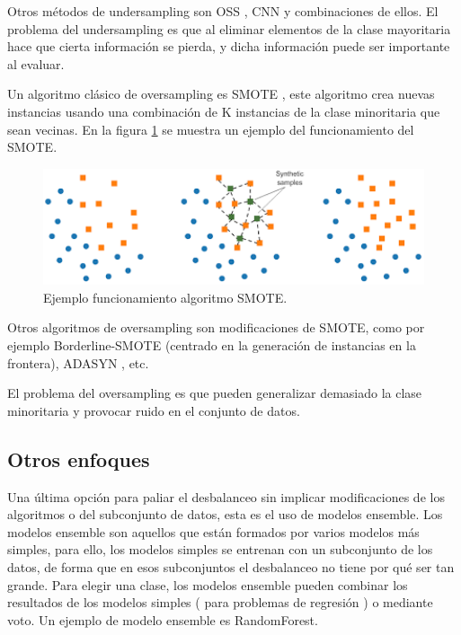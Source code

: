 Otros métodos de undersampling son OSS \cite{kubat1997addressing}, CNN \cite{hart1968condensed} y combinaciones de ellos. El problema del undersampling es que al eliminar elementos de la clase mayoritaria hace que cierta información se pierda, y dicha información puede ser importante al evaluar.\newline

Un algoritmo clásico de oversampling es SMOTE \cite{chawla2002smote}, este algoritmo crea nuevas instancias usando una combinación de K instancias de la clase minoritaria que sean vecinas. En la figura \ref{fig:29} se muestra un ejemplo del funcionamiento del SMOTE.\newline

\begin{figure}[H]
	\centering
	\includegraphics[width=120mm]{imagenes/smote-example.png}
	\caption{Ejemplo funcionamiento algoritmo SMOTE.}
	\label{fig:29}
\end{figure}
\verticalspace

Otros algoritmos de oversampling son modificaciones de SMOTE, como por ejemplo Borderline-SMOTE \cite{han2005borderline} (centrado en la generación de instancias en la frontera), ADASYN \cite{he2008adasyn}, etc.\newline

El problema del oversampling es que pueden generalizar demasiado la clase minoritaria y provocar ruido en el conjunto de datos.

\subsection{Otros enfoques}
Una última opción para paliar el desbalanceo sin implicar modificaciones de los algoritmos o del subconjunto de datos, esta es el uso de modelos ensemble. Los modelos ensemble son aquellos que están formados por varios modelos más simples, para ello, los modelos simples se entrenan con un subconjunto de los datos, de forma que en esos subconjuntos el desbalanceo no tiene por qué ser tan grande. Para elegir una clase, los modelos ensemble pueden combinar los resultados de los modelos simples ( para problemas de regresión ) o mediante voto. Un ejemplo de modelo ensemble es RandomForest.